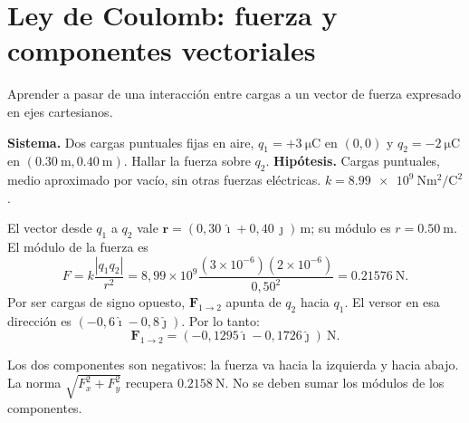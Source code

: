 \documentclass[11pt,a4paper]{article}
\newcommand{\ej}[2]{\clearpage\section{#2}}
\newcommand{\vect}[1]{\boldsymbol{#1}}
\begin{document}
\ej{1}{Ley de Coulomb: fuerza y componentes vectoriales}
\begin{objetivo}Aprender a pasar de una interacción entre cargas a un vector de fuerza expresado en ejes cartesianos.\end{objetivo}
\textbf{Sistema.} Dos cargas puntuales fijas en aire, $q_1=+\SI{3}{\micro\coulomb}$ en $(0,0)$ y $q_2=-\SI{2}{\micro\coulomb}$ en $(\SI{0.30}{\metre},\SI{0.40}{\metre})$. Hallar la fuerza sobre $q_2$.
\textbf{Hipótesis.} Cargas puntuales, medio aproximado por vacío, sin otras fuerzas eléctricas. $k=\SI{8.99e9}{\newton\metre\squared\per\coulomb\squared}$.
\begin{center}\end{center}
\begin{metodo}
El vector desde $q_1$ a $q_2$ vale $\vect r=(0{,}30\,\hat\imath+0{,}40\,\hat\jmath)\,\si{\metre}$; su módulo es $r=\SI{0.50}{\metre}$. El módulo de la fuerza es
\[F=k\frac{|q_1q_2|}{r^2}=8{,}99\times10^9\frac{(3\times10^{-6})(2\times10^{-6})}{0{,}50^2}=\SI{0.21576}{\newton}.\]
Por ser cargas de signo opuesto, $\vect F_{1\to2}$ apunta de $q_2$ hacia $q_1$. El versor en esa dirección es $(-0{,}6\hat\imath-0{,}8\hat\jmath)$. Por lo tanto:
\[\boxed{\vect F_{1\to2}=(-0{,}1295\hat\imath-0{,}1726\hat\jmath)\ \si{\newton}}.\]
\end{metodo}
\begin{resultado}Los dos componentes son negativos: la fuerza va hacia la izquierda y hacia abajo. La norma $\sqrt{F_x^2+F_y^2}$ recupera $\SI{0.2158}{\newton}$. No se deben sumar los módulos de los componentes.\end{resultado}
\end{document}
